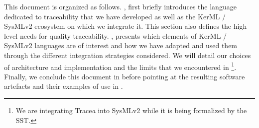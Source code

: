 This document is organized as follows.
, first briefly introduces the language dedicated to traceability that we have developed as well as the KerML / SysMLv2 ecosystem on which we integrate it. This section also defines the high level needs for quality traceability.
, presents which elements of KerML / SysMLv2 languages are of interest and how we have adapted and used them through the different integration strategies considered.
We will detail our choices of architecture and implementation and the limits that we encountered in \footnote{We are integrating Trace\textit{a} into SysMLv2 while it is being formalized by the SST.}.
Finally, we conclude this document in  before pointing at the resulting software artefacts and their examples of use in .






     
     


